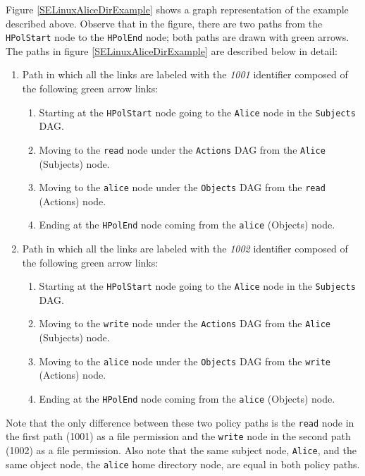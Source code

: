 \documentclass[12pt,letterpaper]{report}
\newcommand{\node}[1]{\texttt{#1}}
\begin{document}
Figure {\ref{SELinuxAliceDirExample}} shows a graph representation of the example described above. Observe that in the figure, there are two paths from the \node{HPolStart} node to the \node{HPolEnd} node; both paths are drawn with green arrows. The paths in figure \ref{SELinuxAliceDirExample} are described below in detail:

\begin{enumerate}
	\item%
	{Path in which all the links are labeled with the \textit{1001} identifier composed of the following green arrow links:
		\begin{enumerate}
			\item%
			Starting at the \node{HPolStart} node going to the \node{Alice} node in the \texttt{Subjects} DAG.
			\item%
			Moving to the \node{read} node under the \texttt{Actions} DAG from the \node{Alice} (Subjects) node.
			\item%
			Moving to the \node{alice} node under the \texttt{Objects} DAG from the \node{read} (Actions) node.
			\item%
			Ending at the \node{HPolEnd} node coming from the \node{alice} (Objects) node.
		\end{enumerate}
	}%
	\item%
	{Path in which all the links are labeled with the \textit{1002} identifier composed of the following green arrow links:
		\begin{enumerate}
			\item%
			Starting at the \node{HPolStart} node going to the \node{Alice} node in the \texttt{Subjects} DAG.
			\item%
			Moving to the \node{write} node under the \texttt{Actions} DAG from the \node{Alice} (Subjects) node.
			\item%
			Moving to the \node{alice} node under the \texttt{Objects} DAG from the \node{write} (Actions) node.
			\item%
			Ending at the \node{HPolEnd} node coming from the \node{alice} (Objects) node.
		\end{enumerate}
	}%
\end{enumerate}

Note that the only difference between these two policy paths is the \node{read} node in the first path (1001) as a file permission and the \node{write} node in the second path (1002) as a file permission. Also note that the same subject node, \node{Alice}, and the same object node, the \node{alice} home directory node, are equal in both policy paths.
\end{document}
